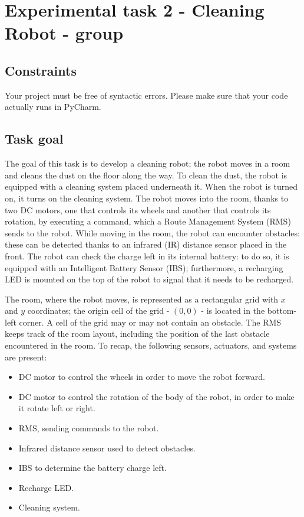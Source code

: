 \chapter{Experimental task 2 - Cleaning Robot - \notdd group}
\section{Constraints}
Your project must be free of syntactic errors. Please make sure that your code actually runs in PyCharm.


\section{Task goal}
The goal of this task is to develop a cleaning robot; the robot moves in a room and cleans the dust on the floor along the way. To clean the dust, the robot is equipped with a cleaning system placed underneath it. When the robot is turned on, it turns on the cleaning system.
The robot moves into the room, thanks to two DC motors, one that controls its wheels and another that controls its rotation, by executing a command, which a Route Management System (RMS) sends to the robot. While moving in the room, the robot can encounter obstacles: these can be detected thanks to an infrared (IR) distance sensor placed in the front.
The robot can check the charge left in its internal battery: to do so, it is equipped with an Intelligent Battery Sensor (IBS); furthermore, a recharging LED is mounted on the top of the robot to signal that it needs to be recharged.

The room, where the robot moves, is represented as a rectangular grid with $x$ and $y$ coordinates; the origin cell of the grid - \ie $(0,0)$ - is located in the bottom-left corner. A cell of the grid may or may not contain an obstacle. The RMS keeps track of the room layout, including the position of the last obstacle encountered in the room.
To recap, the following sensors, actuators, and systems are present:

\begin{itemize}
    \item DC motor to control the wheels in order to move the robot forward.
    \item DC motor to control the rotation of the body of the robot, in order to make it rotate left or right.
    \item RMS, sending commands to the robot.
    \item Infrared distance sensor used to detect obstacles.
    \item IBS to determine the battery charge left.
    \item Recharge LED.
    \item Cleaning system.
\end{itemize}


